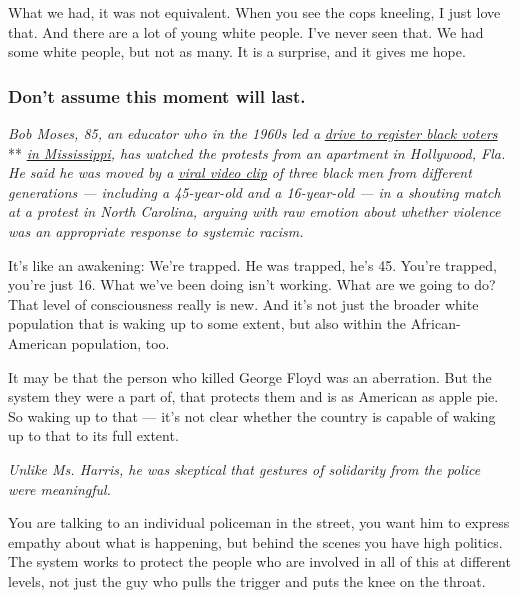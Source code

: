 What we had, it was not equivalent. When you see the cops kneeling, I
just love that. And there are a lot of young white people. I've never
seen that. We had some white people, but not as many. It is a surprise,
and it gives me hope.

\hypertarget{dont-assume-this-moment-will-last}{%
\subsubsection{Don't assume this moment will
last.}\label{dont-assume-this-moment-will-last}}

\emph{Bob Moses, 85, an educator who in the 1960s led a}
\href{https://timesmachine.nytimes.com/timesmachine/1964/11/25/118690271.html?pageNumber=38}{\emph{drive
to register black voters}} **
\href{https://www.nytimes.com/1993/02/21/magazine/mississippi-learning.html?searchResultPosition=4}{\emph{in
Mississippi}}\emph{, has watched the protests from an apartment in
Hollywood, Fla. He said he was moved by a}
\href{https://twitter.com/g0ldie_teee/status/1266929382708465665}{\emph{viral
video clip}} \emph{of three black men from different generations ---
including a 45-year-old and a 16-year-old --- in a shouting match at a
protest in North Carolina, arguing with raw emotion about whether
violence was an appropriate response to systemic racism.}

It's like an awakening: We're trapped. He was trapped, he's 45. You're
trapped, you're just 16. What we've been doing isn't working. What are
we going to do? That level of consciousness really is new. And it's not
just the broader white population that is waking up to some extent, but
also within the African-American population, too.

It may be that the person who killed George Floyd was an aberration. But
the system they were a part of, that protects them and is as American as
apple pie. So waking up to that --- it's not clear whether the country
is capable of waking up to that to its full extent.

\emph{Unlike Ms. Harris, he was skeptical that gestures of solidarity
from the police were meaningful.}

You are talking to an individual policeman in the street, you want him
to express empathy about what is happening, but behind the scenes you
have high politics. The system works to protect the people who are
involved in all of this at different levels, not just the guy who pulls
the trigger and puts the knee on the throat.

